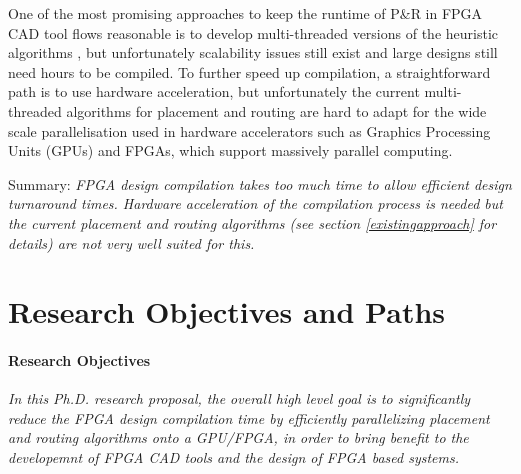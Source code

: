 \documentclass[a4paper,oneside,12pt]{article}
\begin{document}

One of the most promising approaches to keep the runtime of P\&R in FPGA CAD tool flows reasonable is to develop multi-threaded versions of the heuristic algorithms \cite{ludwin2011,gort2012,betz2013method,jain2014multi}, but unfortunately scalability issues still exist and large designs still need hours to be compiled. To further speed up compilation, a straightforward path is to use hardware acceleration, but unfortunately the current multi-threaded algorithms for placement and routing are hard to adapt for the wide scale parallelisation used in hardware accelerators such as Graphics Processing Units (GPUs) and FPGAs, which support massively parallel computing.

Summary: \emph{FPGA design compilation takes too much time to allow efficient design turnaround times. Hardware acceleration of the compilation process is needed but the current placement and routing algorithms (see section \ref{existingapproach} for details) are not very well suited for this.
}

\section{Research Objectives and Paths}

\paragraph{Research Objectives}
\emph{In this Ph.D. research proposal, the overall high level goal is to significantly reduce the FPGA design compilation time by efficiently parallelizing placement and routing algorithms onto a GPU/FPGA, in order to bring benefit to the developemnt of FPGA CAD tools and the design of FPGA based systems. }
\end{document}
